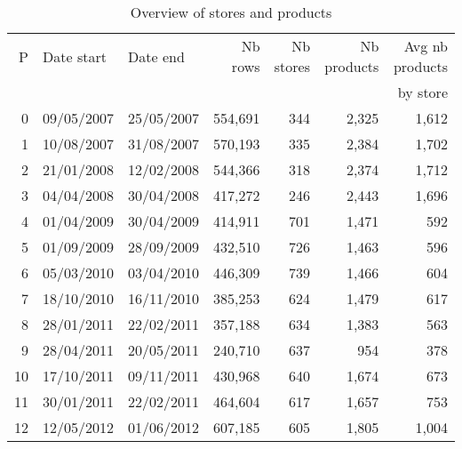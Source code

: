 \documentclass[11pt]{article}
\begin{document}
\begin{table}[H]
\renewcommand{\arraystretch}{0.7}%
\caption{Overview of stores and products}
\small

\begin{tabular}{rllrrrr}
\toprule
\toprule
  P &  Date start &    Date end &  Nb rows &  Nb stores &  Nb products &  Avg nb products \\
\multicolumn{6}{c}{}&  by store \\
\midrule
  0 &  09/05/2007 &  25/05/2007 &  554,691 &        344 &        2,325 &                  1,612 \\
  1 &  10/08/2007 &  31/08/2007 &  570,193 &        335 &        2,384 &                  1,702 \\
  2 &  21/01/2008 &  12/02/2008 &  544,366 &        318 &        2,374 &                  1,712 \\
  3 &  04/04/2008 &  30/04/2008 &  417,272 &        246 &        2,443 &                  1,696 \\
  4 &  01/04/2009 &  30/04/2009 &  414,911 &        701 &        1,471 &                    592 \\
  5 &  01/09/2009 &  28/09/2009 &  432,510 &        726 &        1,463 &                    596 \\
  6 &  05/03/2010 &  03/04/2010 &  446,309 &        739 &        1,466 &                    604 \\
  7 &  18/10/2010 &  16/11/2010 &  385,253 &        624 &        1,479 &                    617 \\
  8 &  28/01/2011 &  22/02/2011 &  357,188 &        634 &        1,383 &                    563 \\
  9 &  28/04/2011 &  20/05/2011 &  240,710 &        637 &          954 &                    378 \\
 10 &  17/10/2011 &  09/11/2011 &  430,968 &        640 &        1,674 &                    673 \\
 11 &  30/01/2011 &  22/02/2011 &  464,604 &        617 &        1,657 &                    753 \\
 12 &  12/05/2012 &  01/06/2012 &  607,185 &        605 &        1,805 &                  1,004 \\
\bottomrule
\end{tabular}
\end{table}



\end{document}

